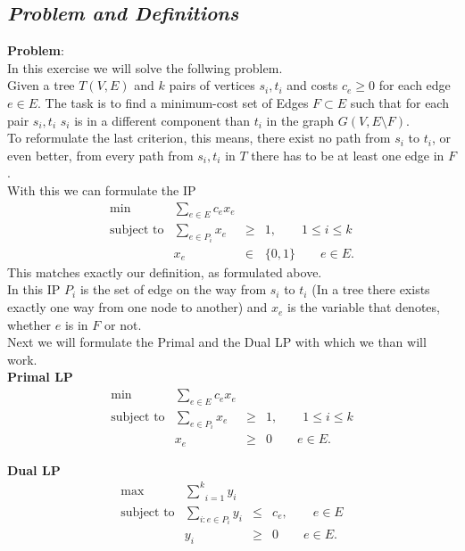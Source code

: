 \subsection*{\itshape Problem and Definitions}
\textbf{Problem}:\\
In this exercise we will solve the follwing problem.\\
Given a tree $T(V,E)$ and $k$ pairs of vertices $s_i,t_i$ and costs $c_e \geq 0$
for each edge $e \in E$. The task is to find a minimum-cost set of Edges $F \subset E$
such that for each pair $s_i,t_i$ $s_i$ is in a different component than
$t_i$ in the graph $G(V,E \setminus F)$.\\

To reformulate the last criterion, this means, there exist no path from $s_i$ to $t_i$,
or even better, from every path from $s_i,t_i$ in $T$ there has to be at least one edge
in $F$.\\

With this we can formulate the IP
$$\begin{array}{rrcl}
   \text{min}&\underset{e\in E}{\sum} c_e x_e &&\\
   \text{subject to} &
      \underset{e \in P_i}{\sum} x_e & \geq & 1, \qquad 1\leq i \leq k\\
      & x_e &\in & \{0,1\} \qquad e \in E.
\end{array}$$
This matches exactly our definition, as formulated above.\\
In this IP $P_i$ is the set of edge on the way from $s_i$ to $t_i$ (In
a tree there exists exactly one way from one node to another) and $x_e$ is
the variable that denotes, whether $e$ is in $F$ or not.\\

Next we will formulate the Primal and the Dual LP with which we than will work.\\

\textbf{Primal LP}
$$\begin{array}{rrcl}
   \text{min}&\underset{e\in E}{\sum} c_e x_e &&\\
   \text{subject to} &
      \underset{e \in P_i}{\sum} x_e & \geq & 1, \qquad 1\leq i \leq k\\
      & x_e &\geq & 0 \qquad e \in E.
\end{array}$$

\textbf{Dual LP}
$$\begin{array}{rrcl}
   \text{max}&\underset{i=1}{\overset{k}{\sum}} y_i &&\\
   \text{subject to} &
      \underset{i : e \in P_i}{\sum} y_i & \leq & c_e, \qquad e \in E\\
      & y_i &\geq & 0 \qquad e \in E.
\end{array}$$

